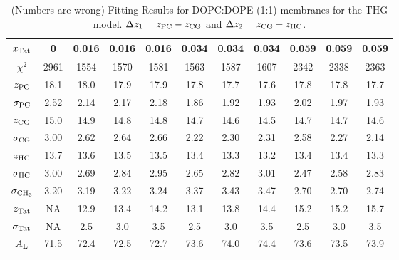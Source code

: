 \begin{table}[htbp]
  \centering
  \begin{tabular}{c|c|ccc|ccc|ccc}
    \hline
    $x_\textrm{Tat}$ & 0 & 0.016 & 0.016 & 0.016 & 0.034 & 0.034 & 0.034 & 0.059 & 0.059 & 0.059 \\
    \hline
    $\chi^2$ & 2961 & 1554 & 1570 & 1581 & 1563 & 1587 & 1607 & 2342 & 2338 & 2363 \\     
    $z_\textrm{PC}$ & 18.1 & 18.0 & 17.9 & 17.9 & 17.8 & 17.7 & 17.6 & 17.8 & 17.8 & 17.7 \\
    $\sigma_\textrm{PC}$ & 2.52 & 2.14 & 2.17 & 2.18 & 1.86 & 1.92 & 1.93 & 2.02 & 1.97 & 1.93 \\
    $z_\textrm{CG}$ & 15.0 & 14.9 & 14.8 & 14.8 & 14.7 & 14.6 & 14.5 & 14.7 & 14.7 & 14.6 \\
    $\sigma_\textrm{CG}$ & 3.00 & 2.62 & 2.64 & 2.66 & 2.22 & 2.30 & 2.31 & 2.58 & 2.27 & 2.14 \\
    $z_\textrm{HC}$ & 13.7 & 13.6 & 13.5 & 13.5 & 13.4 & 13.3 & 13.2 & 13.4 & 13.4 & 13.3 \\ 
    $\sigma_\textrm{HC}$ & 3.00 & 2.69 & 2.84 & 2.95 & 2.65 & 2.82 & 3.01 & 2.47 & 2.58 & 2.83 \\
    $\sigma_{\textrm{CH}_3}$ & 3.20 & 3.19 & 3.22 & 3.24 & 3.37 & 3.43 & 3.47 & 2.70 & 2.70 & 2.74 \\
    $z_\textrm{Tat}$ & NA & 12.9 & 13.4 & 14.2 & 13.1 & 13.8 & 14.4 & 15.2 & 15.2 & 15.7 \\
    $\sigma_\textrm{Tat}$ & NA & 2.5 & 3.0 & 3.5 & 2.5 & 3.0 & 3.5 & 2.5 & 3.0 & 3.5 \\ 
    $A_\textrm{L}$ & 71.5 & 72.4 & 72.5 & 72.7 & 73.6 & 74.0 & 74.4 & 73.6 & 73.5 & 73.9 \\
    \hline
  \end{tabular}
  \caption{(Numbers are wrong) Fitting Results for DOPC:DOPE (1:1) membranes for the THG model. $\Delta z_1 = z_\textrm{PC}-z_\textrm{CG}$
  and $\Delta z_2 = z_\textrm{CG}-z_\textrm{HC}$.}
  \label{tab:DOPCDOPE1to1_fit_results}
\end{table}

